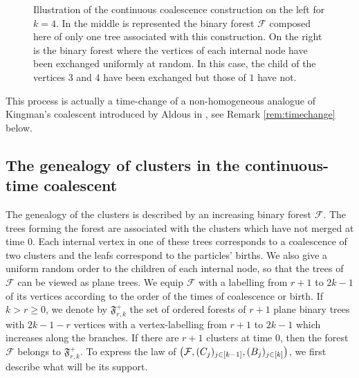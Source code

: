 \documentclass[11pt]{article}
\theoremstyle{plain}
\theoremstyle{definition}
\theoremstyle{remark}
\newcommand{\1}{\mathbbm{1}} %
\let\originalleft\left
\let\originalright\right
\renewcommand{\left}{\mathopen{}\mathclose\bgroup\originalleft}
\renewcommand{\right}{\aftergroup\egroup\originalright}
\begin{document}
\begin{figure}[h!]
\begin{center}
\caption{Illustration of the continuous coalescence construction on the left for $k=4$. In the middle is represented the binary forest $\mathcal F$ composed here of only one tree  associated with this construction. On the right is the binary forest where the vertices of each internal node have been exchanged uniformly at random. In this case, the child of the vertices $3$ and $4$ have been exchanged but those of $1$ have not.}
\label{fig aldous}
\end{center}
\end{figure}


This process is actually a time-change of a non-homogeneous analogue of Kingman's coalescent introduced by Aldous in \cite{A98}, see Remark \ref{rem:timechange} below.

\subsection{The genealogy of clusters in the continuous-time coalescent}
\label{ssec:genealogy}

The genealogy of the clusters is described by an increasing binary forest $\mathcal{F}$. The trees forming the forest are associated with the clusters which have not merged at time $0$. Each internal vertex in one of these trees corresponds to a coalescence of two clusters and the leafs correspond to the particles' births. We also give a uniform random order to the children of each internal node, so that the trees of $\mathcal{F}$ can be viewed as plane trees. We equip $\mathcal{F}$ with a labelling from $r+1$ to $2k-1$ of its vertices according to the order of the times of coalescence or birth. If $k>r\ge 0$, we denote by $\mathfrak{F}^+_{r,k}$ the set of ordered forests of $r+1$ plane binary trees with $2k-1-r$ vertices with a vertex-labelling from $r+1$ to $2k-1$ which increases along the branches. If there are $r+1$ clusters at time $0$, then the forest $\mathcal{F}$ belongs to $\mathfrak{F}^+_{r,k}$. 
To express the law of $\left(\mathcal{F}, (C_j)_{j \in [k-1]}, (B_j)_{j \in [k]}\right)$, we first describe what will be its support.
\end{document}
